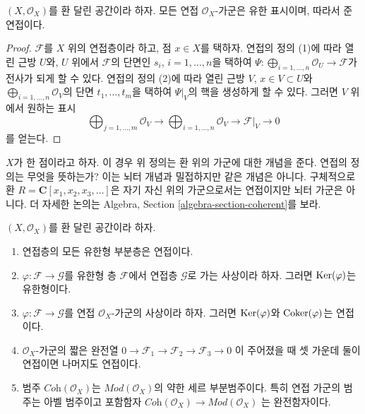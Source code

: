 \begin{lemma}
\label{lemma-coherent-finite-presentation}
$(X, \mathcal{O}_X)$를 환 달린 공간이라 하자.
모든 연접 $\mathcal{O}_X$-가군은 유한 표시이며, 따라서 준연접이다.
\end{lemma}

\begin{proof}
$\mathcal{F}$를 $X$ 위의 연접층이라 하고, 점 $x \in X$를 택하자.
연접의 정의 (1)에 따라 열린 근방 $U$와, $U$ 위에서
$\mathcal{F}$의 단면인 $s_i$, $i = 1, \ldots, n$을 택하여
$\Psi : \bigoplus_{i = 1, \ldots, n} \mathcal{O}_U \to \mathcal{F}$가
전사가 되게 할 수 있다. 연접의 정의 (2)에 따라 열린 근방
$V$, $x \in V \subset U$와
$\bigoplus_{i = 1, \ldots, n} \mathcal{O}_V$의 단면
$t_1, \ldots, t_m$을 택하여 $\Psi|_V$의 핵을 생성하게 할 수 있다.
그러면 $V$ 위에서 원하는 표시
$$
\bigoplus\nolimits_{j = 1, \ldots, m}
\mathcal{O}_V
\longrightarrow
\bigoplus\nolimits_{i = 1, \ldots, n}
\mathcal{O}_V
\to
\mathcal{F}|_V
\to
0
$$
를 얻는다.
\end{proof}

\begin{example}
\label{example-coherent-not-Noetherian}
$X$가 한 점이라고 하자. 이 경우 위 정의는 환 위의 가군에 대한 개념을 준다.
연접의 정의는 무엇을 뜻하는가?
이는 뇌터 개념과 밀접하지만 같은 개념은 아니다. 구체적으로 환
$R = \mathbf{C}[x_1, x_2, x_3, \ldots]$은 자기 자신 위의 가군으로서는
연접이지만 뇌터 가군은 아니다. 더 자세한 논의는 Algebra, Section
\ref{algebra-section-coherent}를 보라.
\end{example}

\begin{lemma}
\label{lemma-coherent-abelian}
$(X, \mathcal{O}_X)$를 환 달린 공간이라 하자.
\begin{enumerate}
\item 연접층의 모든 유한형 부분층은 연접이다.
\item $\varphi : \mathcal{F} \to \mathcal{G}$를 유한형 층
$\mathcal{F}$에서 연접층 $\mathcal{G}$로 가는 사상이라 하자.
그러면 $\mathop{\mathrm{Ker}}(\varphi)$는 유한형이다.
\item $\varphi : \mathcal{F} \to \mathcal{G}$를 연접
$\mathcal{O}_X$-가군의 사상이라 하자. 그러면
$\mathop{\mathrm{Ker}}(\varphi)$와 $\mathop{\mathrm{Coker}}(\varphi)$는 연접이다.
\item $\mathcal{O}_X$-가군의 짧은 완전열
$0 \to \mathcal{F}_1 \to \mathcal{F}_2 \to \mathcal{F}_3 \to 0$
이 주어졌을 때 셋 가운데 둘이 연접이면 나머지도 연접이다.
\item 범주 $\textit{Coh}(\mathcal{O}_X)$는
$\textit{Mod}(\mathcal{O}_X)$의 약한 세르 부분범주이다.
특히 연접 가군의 범주는 아벨 범주이고 포함함자
$\textit{Coh}(\mathcal{O}_X) \to \textit{Mod}(\mathcal{O}_X)$
는 완전함자이다.
\end{enumerate}
\end{lemma}

